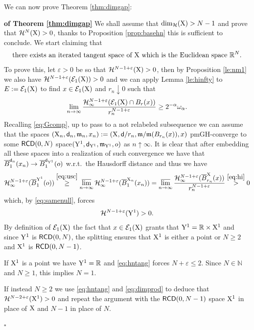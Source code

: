 \documentclass[reqno,11pt]{article}
\numberwithin{equation}{section}
\newcommand{\N}{\mathbb{N}}
\newcommand{\R}{\mathbb{R}}
\newcommand{\mm}{{\mbox{\boldmath$m$}}}
\newcommand{\sfd}{{\sf d}}
\newcommand{\eps}{\varepsilon}
\newcommand{\lims}{\varlimsup}
\renewcommand{\mm}{\mathfrak m}                                %
\newenvironment{proofb}{\removelastskip\par\medskip   %
\noindent{\em{\bf Proof}} \rm}{\penalty-20\null\hfill$\square$\par\medbreak}
\newcommand{\X}{{\rm X}}
\newcommand{\Y}{{\rm Y}}
\newcommand{\RCD}{{\sf RCD}}
\newcommand{\HH}{{\mathcal H}}
\begin{document}
We can now prove Theorem \ref{thm:dimgap}:
\begin{proofb}{\bf of Theorem \ref{thm:dimgap}} We shall assume that $\dim_\HH(\X)>N-1$ and prove that $\HH^N(\X)>0$, thanks to Proposition \ref{prop:basehn} this is sufficient to conclude. We start claiming that
\begin{equation}
\label{eq:claimtang}
\textrm{there exists an iterated tangent space of $\X$ which is the Euclidean space $\R^N$.}
\end{equation}
To prove this, let  $\eps>0$ be so that $\HH^{N-1+\eps}(\X)>0$, then by  Proposition \ref{le:nm1} we also have $\HH^{N-1+\eps}(\mathcal E_1(\X))>0$   and we can apply Lemma \ref{le:hinfty} to $E:=\mathcal E_1(\X)$ to find $x\in\mathcal E_1(\X)$ and $r_n\downarrow0$ such that 
\begin{equation}
\label{eq:hi}
\lim_{n\to\infty}\frac{\HH_\infty^{N-1+\eps}(\mathcal E_1(\X)\cap B_r(x)) }{r_n^{N-1+\eps}}\geq 2^{-\alpha}\omega_\alpha.
\end{equation} 
Recalling \eqref{eq:Gcomp}, up to pass to a not relabeled subsequence  we can assume that the spaces $(\X_n,\sfd_n,\mm_n,x_n):=(\X,\sfd/r_n,\mm/\mm(B_{r_n}(x)),x)$ pmGH-converge to some $\RCD(0,N)$ space\linebreak $(\Y^1,\sfd_{\Y^1},\mm_{\Y^1},o)$ as $n\uparrow\infty$. It is clear that after embedding all these spaces into a realization of such convergence we have that $\overline B^{\sfd_n}_1(x_n)\to \overline B^{\sfd_{\Y^1}}_1(o)$ w.r.t.\ the Hausdorff distance and thus we have
\[
\HH_\infty^{N-1+\eps}( \overline B^{\Y^1}_1(o))\stackrel{\eqref{eq:usc}}\geq\lims_{n\to\infty}\HH_\infty^{N-1+\eps}(\overline B^{\X_n}_1(x_n))=\lims_{n\to\infty}\frac{\HH_\infty^{N-1+\eps}(\overline B^{\X}_{r_n}(x))}{r_n^{N-1+\eps}}\stackrel{\eqref{eq:hi}}>0
\] 
which, by \eqref{eq:samenull}, forces 
\begin{equation}
\label{eq:hntang}
\HH^{N-1+\eps}(\Y^1)>0.
\end{equation}
By definition of $\mathcal E_1(\X)$ the fact that  $x\in \mathcal E_1(\X)$ grants that $\Y^1=\R\times \X^1$ and since  $\Y^1$ is $\RCD(0,N)$, the splitting ensures that $\X^1$ is either a point  or $N\geq 2$ and $\X^1$  is $\RCD(0,N-1)$.

If $\X^1$ is a point we have $\Y^1=\R$ and \eqref{eq:hntang} forces $N+\eps\leq 2$. Since $N\in\N$ and $N\geq 1$, this implies $N=1$.

If instead $N\geq 2$ we use \eqref{eq:hntang} and \eqref{eq:dimprod} to deduce that  $ \HH^{N-2+\eps}(\X^1)>0$ and repeat the argument with the $\RCD(0,N-1)$ space $\X^1$ in place of $\X$ and $N-1$ in place of $N$.


\end{proofb}
\end{document}
